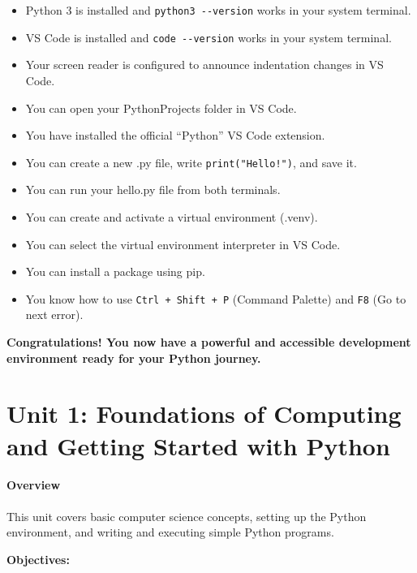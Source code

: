 \documentclass[
  justified,
  openright,
]{tufte-book}
\let\subsection\paragraph
\let\paragraph\paragraph
\let\subsection\paragraph
\let\paragraph\paragraph
\providecommand{\tightlist}{%
  \setlength{\itemsep}{0pt}\setlength{\parskip}{0pt}}
\begin{document}
\begin{itemize}
\tightlist
\item[$\square$]
  Python 3 is installed and \texttt{python3\ -\/-version} works in your
  system terminal.
\item[$\square$]
  VS Code is installed and \texttt{code\ -\/-version} works in your
  system terminal.
\item[$\square$]
  Your screen reader is configured to announce indentation changes in VS
  Code.
\item[$\square$]
  You can open your PythonProjects folder in VS Code.
\item[$\square$]
  You have installed the official ``Python'' VS Code extension.
\item[$\square$]
  You can create a new .py file, write \texttt{print("Hello!")}, and
  save it.
\item[$\square$]
  You can run your hello.py file from both terminals.
\item[$\square$]
  You can create and activate a virtual environment (.venv).
\item[$\square$]
  You can select the virtual environment interpreter in VS Code.
\item[$\square$]
  You can install a package using pip.
\item[$\square$]
  You know how to use \texttt{Ctrl\ +\ Shift\ +\ P} (Command Palette)
  and \texttt{F8} (Go to next error).
\end{itemize}

\textbf{Congratulations! You now have a powerful and accessible
development environment ready for your Python journey.}

\newpage

\section{Unit 1: Foundations of Computing and Getting Started with
Python}\label{unit-1-foundations-of-computing-and-getting-started-with-python}

\subsection{Overview}\label{overview-1}

This unit covers basic computer science concepts, setting up the Python
environment, and writing and executing simple Python programs.

\textbf{Objectives:}
\end{document}
